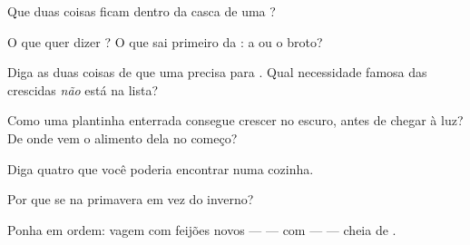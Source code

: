 \begin{exercise}[$\star$]\label{exo:g2:from-seed-to-plant:1}
Que duas coisas ficam dentro da casca de uma ?
\end{exercise}

\begin{exercise}[$\star$]\label{exo:g2:from-seed-to-plant:2}
O que quer dizer \emph{}? O que sai primeiro da : a
 ou o broto?
\end{exercise}

\begin{exercise}[$\star$]\label{exo:g2:from-seed-to-plant:3}
Diga as duas coisas de que uma  precisa para . Qual
necessidade famosa das  crescidas \emph{não} está na lista?
\end{exercise}

\begin{exercise}[$\star$]\label{exo:g2:from-seed-to-plant:4}
Como uma plantinha enterrada consegue crescer no escuro, antes de
chegar à luz? De onde vem o alimento dela no começo?
\end{exercise}

\begin{exercise}[$\star$]\label{exo:g2:from-seed-to-plant:5}
Diga quatro  que você poderia encontrar numa cozinha.
\end{exercise}

\begin{exercise}[$\star$]\label{exo:g2:from-seed-to-plant:6}
Por que se  na primavera em vez do inverno?
\end{exercise}

\begin{exercise}[$\star$]\label{exo:g2:from-seed-to-plant:7}
Ponha em ordem: vagem com feijões novos ---  ---  com
 ---  ---  cheia de .
\end{exercise}

